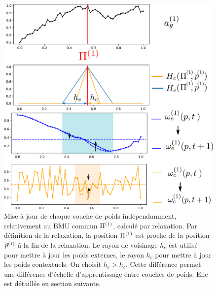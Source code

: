\begin{figure}
\begin{minipage}[c]{0.6\textwidth}
\includegraphics[width=\textwidth]{maj_2som.pdf}
\end{minipage}
\hfill
\begin{minipage}[c]{0.35\textwidth}
\caption{Mise à jour de chaque couche de poids indépendamment, relativement au BMU commun $\Pi^{({1})}$, calculé par relaxation. Par définition de la relaxation, la position $\Pi^{({1})}$ est proche de la position $\hat{p}^{({1})}$ à la fin de la relaxation. Le rayon de voisinage $h_e$ est utilisé pour mettre à jour les poids externes, le rayon $h_c$ pour mettre à jour les poids contextuels. On choisit $h_e > h_c$. Cette différence permet une différence d'échelle d'apprentissage entre couches de poids. Elle est détaillée en section suivante.\label{fig:maj}}
\end{minipage}
\end{figure}

